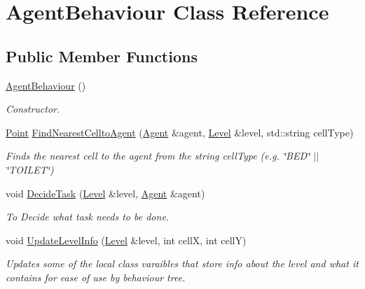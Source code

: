 \hypertarget{class_agent_behaviour}{}\section{Agent\+Behaviour Class Reference}
\label{class_agent_behaviour}
\subsection*{Public Member Functions}
\begin{DoxyCompactItemize}
\item 
\mbox{\label{class_agent_behaviour_a9f244a1d2875f6ecd3ed75860bdd1e38}} 
\hyperlink{class_agent_behaviour_a9f244a1d2875f6ecd3ed75860bdd1e38}{Agent\+Behaviour} ()
\begin{DoxyCompactList}\small\item\em Constructor. \end{DoxyCompactList}\item 
\mbox{\label{class_agent_behaviour_afbb7103a8960b8b1982b71d25c036e71}} 
\hyperlink{class_point}{Point} \hyperlink{class_agent_behaviour_afbb7103a8960b8b1982b71d25c036e71}{Find\+Nearest\+Cellto\+Agent} (\hyperlink{class_agent}{Agent} \&agent, \hyperlink{class_level}{Level} \&level, std\+::string cell\+Type)
\begin{DoxyCompactList}\small\item\em Finds the nearest cell to the agent from the string cell\+Type (e.\+g. \char`\"{}\+B\+E\+D\char`\"{} $\vert$$\vert$ \char`\"{}\+T\+O\+I\+L\+E\+T\char`\"{}) \end{DoxyCompactList}\item 
\mbox{\label{class_agent_behaviour_a2a4f982b17f2bc0c7753aff6441d2667}} 
void \hyperlink{class_agent_behaviour_a2a4f982b17f2bc0c7753aff6441d2667}{Decide\+Task} (\hyperlink{class_level}{Level} \&level, \hyperlink{class_agent}{Agent} \&agent)
\begin{DoxyCompactList}\small\item\em To Decide what task needs to be done. \end{DoxyCompactList}\item 
\mbox{\label{class_agent_behaviour_a8f86aedeaebdab4553e0fe04e8593999}} 
void \hyperlink{class_agent_behaviour_a8f86aedeaebdab4553e0fe04e8593999}{Update\+Level\+Info} (\hyperlink{class_level}{Level} \&level, int cellX, int cellY)
\begin{DoxyCompactList}\small\item\em Updates some of the local class varaibles that store info about the level and what it contains for ease of use by behaviour tree. \end{DoxyCompactList}\end{DoxyCompactItemize}
